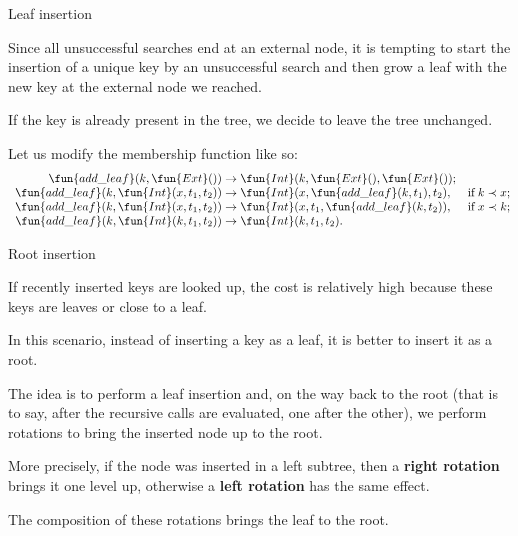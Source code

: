 %
\begin{frame}{Leaf insertion}

  Since all unsuccessful searches end at an external node, it is
  tempting to start the insertion of a unique key by an unsuccessful
  search and then grow a leaf with the new key at the external node we
  reached.

  \bigskip

  If the key is already present in the tree, we decide to leave the
  tree unchanged.

  \bigskip

  Let us modify the membership function like so:
  \begin{equation*}
    \begin{array}{r@{\;}c@{\;}l@{\quad}l@{}}
      \fun{add\_leaf}(k, \fun{Ext}()) & \rightarrow & \fun{Int}(k, \fun{Ext}(), \fun{Ext}());\\
      \fun{add\_leaf}(k, \fun{Int}(x, t_1, t_2)) & \rightarrow
      & \fun{Int}(x, \fun{add\_leaf}(k, t_1), t_2), & \text{if} \; k \prec x; \\
      \fun{add\_leaf}(k, \fun{Int}(x, t_1, t_2)) & \rightarrow
      & \fun{Int}(x, t_1, \fun{add\_leaf}(k, t_2)), & \text{if} \; x \prec k; \\
      \fun{add\_leaf}(k, \fun{Int}(k, t_1, t_2)) & \rightarrow
      & \fun{Int}(k, t_1, t_2).
    \end{array}
  \end{equation*}

\end{frame}

%
\begin{frame}{Root insertion}

  If recently inserted keys are looked up, the cost is relatively high
  because these keys are leaves or close to a leaf.

  \bigskip

  In this scenario, instead of inserting a key as a leaf, it is better
  to insert it as a root.

  \bigskip

  The idea is to perform a leaf insertion and, on the way back to the
  root (that is to say, after the recursive calls are evaluated, one
  after the other), we perform rotations to bring the inserted node up
  to the root.

  \bigskip

  More precisely, if the node was inserted in a left subtree, then a
  \textbf{right rotation} brings it one level up, otherwise a
  \textbf{left rotation} has the same effect.

  \bigskip

  The composition of these rotations brings the leaf to the root.

\end{frame}


